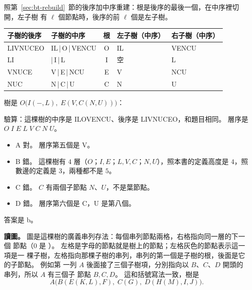 照第~\ref{sec:bt-rebuild}~節的後序加中序重建：根是後序的最後一個，在中序裡切開，左子樹
有 $\ell$ 個節點時，後序的前 $\ell$ 個是左子樹。
\begin{center}
\begin{tabular}{llcll}
\toprule
子樹的後序 & 子樹的中序 & 根 & 左子樹（中序）& 右子樹（中序）\\
\midrule
LIVNUCEO & IL\,|\,O\,|\,VENCU & O & IL & VENCU \\
LI & |\,I\,|\,L & I & 空 & L \\
VNUCE & V\,|\,E\,|\,NCU & E & V & NCU \\
NUC & N\,|\,C\,|\,U & C & N & U \\
\bottomrule
\end{tabular}
\end{center}
樹是 $O\bigl(I(-, L),\; E(V, C(N, U))\bigr)$：
\begin{center}
\end{center}
驗算：這棵樹的中序是 ILOVENCU、後序是 LIVNUCEO，和題目相同。 層序是
$O\;I\;E\;L\;V\;C\;N\;U$。

\begin{itemize}
\item A 對。 層序第五個是 V。
\item B 錯。 這棵樹有 $4$ 層（$O$；$I, E$；$L, V, C$；$N, U$），照本書的定義高度是
$4$，照數邊的定義是 $3$，兩種都不是 $5$。
\item C 錯。 $C$ 有兩個子節點 $N$、$U$，不是葉節點。
\item D 錯。 層序第六個是 C，U 是第八個。
\end{itemize}

答案是 b。

\textbf{讀圖。} 圖是這棵樹的廣義串列存法：每個串列節點兩格，右格指向同一層的下一個
節點（$0$ 是 \NIL）。 左格是字母的節點就是樹上的節點；左格灰色的節點表示這一項是一
棵子樹，左格指向那棵子樹的串列，串列的第一個是子樹的根，後面是它的子節點。 例如第
一列 $A$ 後面接了三個子樹項，分別指向以 $B$、$C$、$D$ 開頭的串列，所以 $A$ 有三個子
節點 $B, C, D$。 這和括號寫法一致，樹是
\[
A\bigl(B(E(K, L), F),\; C(G),\; D(H(M), I, J)\bigr).
\]


